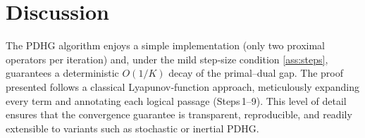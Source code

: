 \documentclass{article}
\begin{document}
\section*{Discussion}
The PDHG algorithm enjoys a simple implementation (only two proximal operators per iteration) and, under the mild step‑size condition \eqref{ass:steps}, guarantees a deterministic $O(1/K)$ decay of the primal–dual gap.  The proof presented follows a classical Lyapunov‑function approach, meticulously expanding every term and annotating each logical passage (Steps 1–9).  This level of detail ensures that the convergence guarantee is transparent, reproducible, and readily extensible to variants such as stochastic or inertial PDHG.
\end{document}
